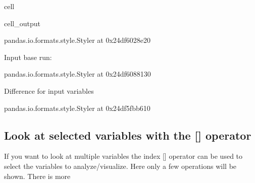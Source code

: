 \documentclass[letterpaper,10pt,english]{jupyterBook}
\begin{document}
\begin{sphinxuseclass}{cell}
\begin{sphinxVerbatimOutput}
\begin{sphinxuseclass}{cell_output}
\begin{sphinxVerbatim}[commandchars=\\\{\}]
\PYGZlt{}pandas.io.formats.style.Styler at 0x24df6028e20\PYGZgt{}
\end{sphinxVerbatim}

\begin{sphinxVerbatim}[commandchars=\\\{\}]
Input base run:
\end{sphinxVerbatim}

\begin{sphinxVerbatim}[commandchars=\\\{\}]
\PYGZlt{}pandas.io.formats.style.Styler at 0x24df6088130\PYGZgt{}
\end{sphinxVerbatim}

\begin{sphinxVerbatim}[commandchars=\\\{\}]
Difference for input variables
\end{sphinxVerbatim}

\begin{sphinxVerbatim}[commandchars=\\\{\}]
\PYGZlt{}pandas.io.formats.style.Styler at 0x24df5fbb610\PYGZgt{}
\end{sphinxVerbatim}

\begin{sphinxVerbatim}[commandchars=\\\{\}]

\end{sphinxVerbatim}

\end{sphinxuseclass}\end{sphinxVerbatimOutput}

\end{sphinxuseclass}

\subsection{Look at selected variables with the {[}{]} operator}
\label{\detokenize{content/howto/experiments/create_experiment:look-at-selected-variables-with-the-operator}}
\sphinxAtStartPar
If you want to look at multiple variables the index {[}{]} operator can be used to select the variables to analyze/visualize. Here only a few operations will be shown. There is more {\hyperref[\detokenize{content/Python/modelflow_features:index-operator}]{}}
\end{document}
